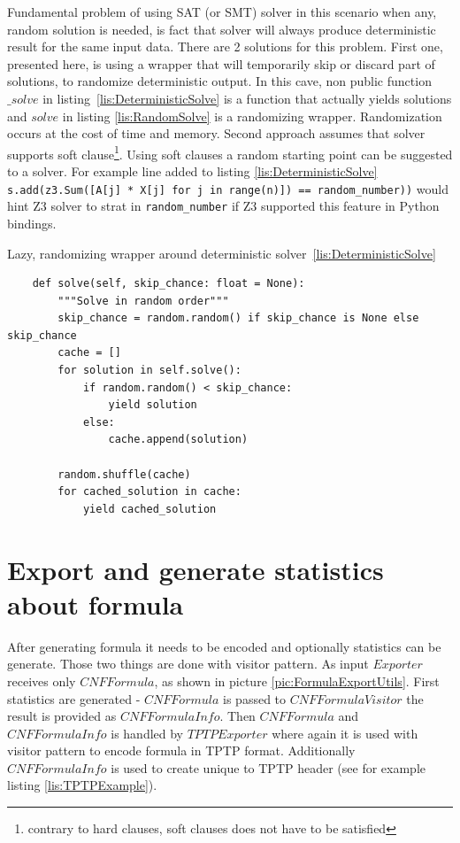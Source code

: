 Fundamental problem of using SAT (or SMT) solver in this scenario when any, random solution is needed, is fact that solver will always produce deterministic result for the same input data. There are 2 solutions for this problem. First one, presented here, is using a wrapper that will temporarily skip or discard part of solutions, to randomize deterministic output. In this cave, non public function $\_solve$ in listing~\ref{lis:DeterministicSolve} is a function that actually yields solutions and $solve$ in listing \ref{lis:RandomSolve} is a randomizing wrapper. Randomization occurs at the cost of time and memory. Second approach assumes that solver supports soft clause\footnote{contrary to hard clauses, soft clauses does not have to be satisfied}. Using soft clauses a random starting point can be suggested to a solver. For example line added to listing \ref{lis:DeterministicSolve} \texttt{s.add(z3.Sum([A[j] * X[j] for j in range(n)]) == random_number))} would hint Z3 solver to strat in \texttt{random_number} if Z3 supported this feature in Python bindings.

\begin{listing}[H]
  \caption{Lazy, randomizing wrapper around deterministic solver~\ref{lis:DeterministicSolve}}
  \label{lis:RandomSolve}
\begin{verbatim}
    def solve(self, skip_chance: float = None):
        """Solve in random order"""
        skip_chance = random.random() if skip_chance is None else skip_chance
        cache = []
        for solution in self.solve():
            if random.random() < skip_chance:
                yield solution
            else:
                cache.append(solution)

        random.shuffle(cache)
        for cached_solution in cache:
            yield cached_solution
\end{verbatim}
\end{listing}


\section{Export and generate statistics about formula}
\label{sec:GenerateStatisticsAboutFormula}

After generating formula it needs to be encoded and optionally statistics can be generate. Those two things are done with visitor pattern. As input $Exporter$ receives only $CNFFormula$, as shown in picture \ref{pic:FormulaExportUtils}. First statistics are generated - $CNFFormula$ is passed to $CNFFormulaVisitor$ the result is provided as $CNFFormulaInfo$. Then $CNFFormula$ and $CNFFormulaInfo$ is handled by $TPTPExporter$ where again it is used with visitor pattern to encode formula in TPTP format. Additionally $CNFFormulaInfo$ is used to create unique to TPTP header (see for example listing \ref{lis:TPTPExample}).

